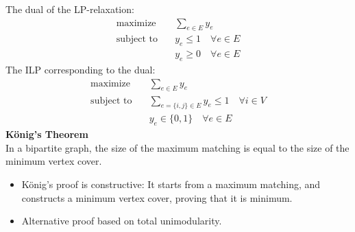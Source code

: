 \documentclass[onecolumn]{report}
\begin{document}
The dual of the LP-relaxation:
\begin{equation*}
    \begin{aligned}
    \text{maximize} \quad & \sum_{e \in E} y_e\\
    \text{subject to} \quad & y_e \leq 1 \quad \forall e \in E\\
    & y_e \geq 0 \quad \forall e \in E
    \end{aligned}
\end{equation*}
The ILP corresponding to the dual:
\begin{equation*}
    \begin{aligned}
    \text{maximize} \quad & \sum_{e \in E} y_e\\
    \text{subject to} \quad & \sum_{e=\{i,j\} \in E} y_e \leq 1 \quad \forall i \in V\\
    & y_e \in \{0,1\} \quad \forall e \in E
    \end{aligned}
\end{equation*}
\textbf{König's Theorem}\\
In a bipartite graph, the size of the maximum matching is equal to the size of the minimum vertex cover.
\begin{itemize}
    \item König's proof is constructive: It starts from a maximum matching, and constructs a minimum vertex cover, proving that it is minimum.
    \item Alternative proof based on total unimodularity.
\end{itemize}
\end{document}
